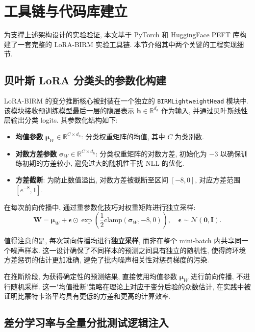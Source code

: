 \documentclass[a4paper,punct=banjiao,twoside]{ctexrep}
\theoremstyle{plain}
\theoremstyle{definition}
\theoremstyle{remark}
\begin{document}
\section{工具链与代码库建立}

为支撑上述架构设计的实验验证, 本文基于 PyTorch 和 HuggingFace PEFT 库构建了一套完整的 LoRA-BIRM 实验工具链. 本节介绍其中两个关键的工程实现细节.

\subsection{贝叶斯 LoRA 分类头的参数化构建}

LoRA-BIRM 的变分推断核心被封装在一个独立的 \texttt{BIRMLightweightHead} 模块中. 该模块接收预训练模型最后一层的隐层表示 $\mathbf{h} \in \mathbb{R}^{d_h}$ 作为输入, 并通过贝叶斯线性层输出分类 logits. 其参数化结构如下:

\begin{itemize}
    \item \textbf{均值参数} $\boldsymbol{\mu}_W \in \mathbb{R}^{C \times d_h}$: 分类权重矩阵的均值, 其中 $C$ 为类别数.
    \item \textbf{对数方差参数} $\boldsymbol{\sigma}_W \in \mathbb{R}^{C \times d_h}$: 分类权重矩阵的对数方差, 初始化为 $-3$ 以确保训练初期的方差较小, 避免过大的随机性干扰 NLL 的优化.
    \item \textbf{方差截断}: 为防止数值溢出, 对数方差被截断至区间 $[-8, 0]$, 对应方差范围 $[e^{-8}, 1]$.
\end{itemize}

在每次前向传播中, 通过重参数化技巧对权重矩阵进行独立采样:
\begin{equation}
    \mathbf{W} = \boldsymbol{\mu}_W + \boldsymbol{\epsilon} \odot \exp\!\left(\frac{1}{2} \text{clamp}(\boldsymbol{\sigma}_W, -8, 0)\right), \quad \boldsymbol{\epsilon} \sim \mathcal{N}(\mathbf{0}, \mathbf{I}).
\end{equation}

值得注意的是, 每次前向传播均进行\textbf{独立采样}, 而非在整个 mini-batch 内共享同一个噪声样本. 这一设计确保了不同样本的预测之间具有独立的随机性, 使得跨环境方差惩罚的估计更加准确, 避免了批内噪声相关性对惩罚梯度的污染.

在推断阶段, 为获得确定性的预测结果, 直接使用均值参数 $\boldsymbol{\mu}_W$ 进行前向传播, 不进行随机采样. 这一"均值推断"策略在理论上对应于变分后验的众数估计, 在实践中被证明比蒙特卡洛平均具有更低的方差和更高的计算效率.

\subsection{差分学习率与全量分批测试逻辑注入}
\end{document}
